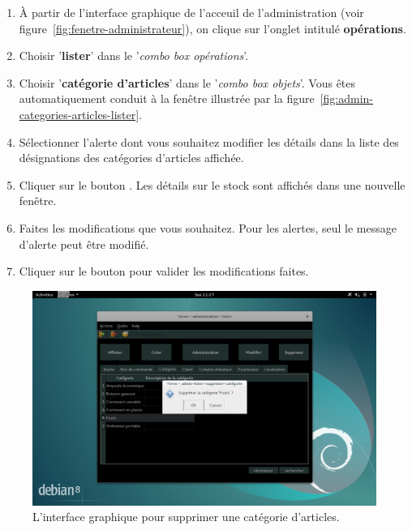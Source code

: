 \begin{enumerate}[1)]
	\item \`A partir de l'interface graphique de l'acceuil de
		l'administration (voir figure~\ref{fig:fenetre-administrateur}),
		on clique sur l'onglet intitul\'e \textbf{op\'erations}. 
		
	\item Choisir '\textbf{lister}' dans le '\emph{combo box
		op\'erations}'.
		
	\item Choisir '\textbf{cat\'egorie d'articles}' dans le
		'\emph{combo box objets}'. Vous \^etes automatiquement
		conduit \`a la fen\^etre illustr\'ee par la
		figure~\ref{fig:admin-categories-articles-lister}.
		
	\item S\'electionner l'alerte dont vous souhaitez modifier
		les d\'etails dans la liste	des d\'esignations des
		cat\'egories d'articles affich\'ee.
		
	\item Cliquer sur le bouton . Les d\'etails
		sur le stock sont affich\'es dans une nouvelle fen\^etre.
		
	\item Faites les modifications que vous souhaitez. Pour
		les alertes, seul le message d'alerte peut \^etre
		modifi\'e.
		
	\item Cliquer sur le bouton  pour valider
		les modifications faites.
\end{enumerate}


\newpage
{}

\begin{figure}[!htpb]
	\centering
	\includegraphics[scale=0.39]{images/categorie-articles-supprimer.png}
	\caption{L'interface graphique pour supprimer une cat\'egorie d'articles.}
	\label{fig:admin-categories-articles-supprimer}
\end{figure}

